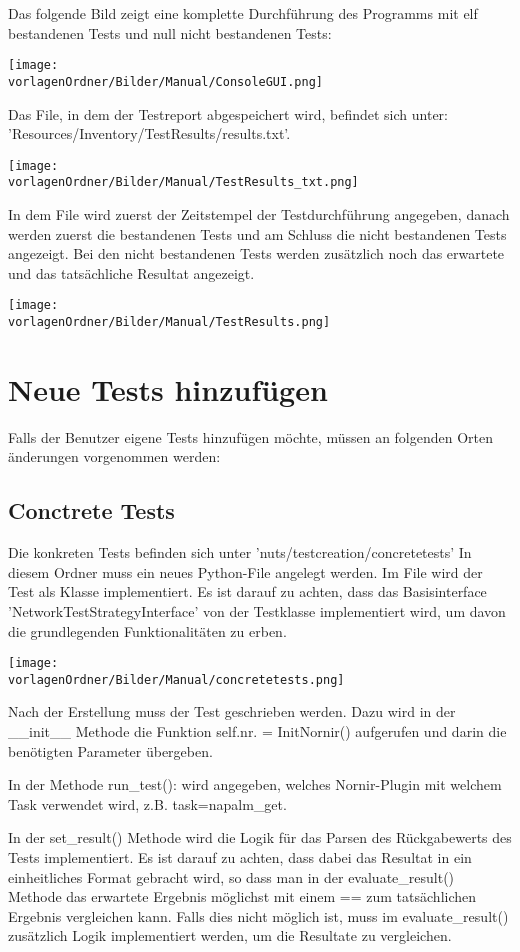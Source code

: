 \documentclass[
	ngerman,
	toc=listof, %
	toc=bibliography, %
	footnotes=multiple, %
	parskip=half, %
	numbers=noendperiod %
]{scrartcl}
\newcommand{\vorlagenOrdner}{../99_Vorlagen} %
\begin{document}
		Das folgende Bild zeigt eine komplette Durchführung des Programms mit elf bestandenen
		Tests und null nicht bestandenen Tests: 

		\texttt{[image: \\vorlagenOrdner/Bilder/Manual/ConsoleGUI.png]}

		\newpage

		Das File, in dem der Testreport abgespeichert wird, befindet sich unter: 
		'Resources/Inventory/TestResults/results.txt'.

		\texttt{[image: \\vorlagenOrdner/Bilder/Manual/TestResults\_txt.png]}

		In dem File wird zuerst der Zeitstempel der Testdurchführung angegeben, 
		danach werden zuerst die bestandenen Tests und am Schluss die nicht bestandenen Tests angezeigt.
		Bei den nicht bestandenen Tests werden zusätzlich noch das erwartete und das tatsächliche
		Resultat angezeigt.

		\texttt{[image: \\vorlagenOrdner/Bilder/Manual/TestResults.png]}

\section{Neue Tests hinzufügen}
	Falls der Benutzer eigene Tests hinzufügen möchte,
	 müssen an folgenden Orten änderungen vorgenommen werden:

	\subsection{Conctrete Tests}
		Die konkreten Tests befinden sich unter 'nuts/testcreation/concretetests'
		In diesem Ordner muss ein neues Python-File angelegt werden.
		Im File wird der Test als Klasse implementiert.
		Es ist darauf zu achten, dass das Basisinterface 'NetworkTestStrategyInterface' 
		von der Testklasse implementiert wird, um davon die grundlegenden Funktionalitäten
		zu erben.

		\texttt{[image: \\vorlagenOrdner/Bilder/Manual/concretetests.png]}

		Nach der Erstellung muss der Test geschrieben werden.
		Dazu wird in der \_\_init\_\_ Methode die Funktion self.nr. = InitNornir() aufgerufen
		und darin die benötigten Parameter übergeben.

		In der Methode run\_test(): wird angegeben, welches Nornir-Plugin mit welchem Task
		verwendet wird, z.B. task=napalm\_get.
		
		In der set\_result() Methode wird die Logik für das Parsen des Rückgabewerts des Tests
		implementiert. 
		Es ist darauf zu achten, dass dabei das Resultat in ein einheitliches Format gebracht 
		wird, so dass man in der evaluate\_result() Methode das erwartete Ergebnis möglichst 
		mit einem == zum tatsächlichen Ergebnis vergleichen kann.
		Falls dies nicht möglich ist, muss im evaluate\_result() zusätzlich Logik implementiert
		werden, um die Resultate zu vergleichen.
\end{document}

